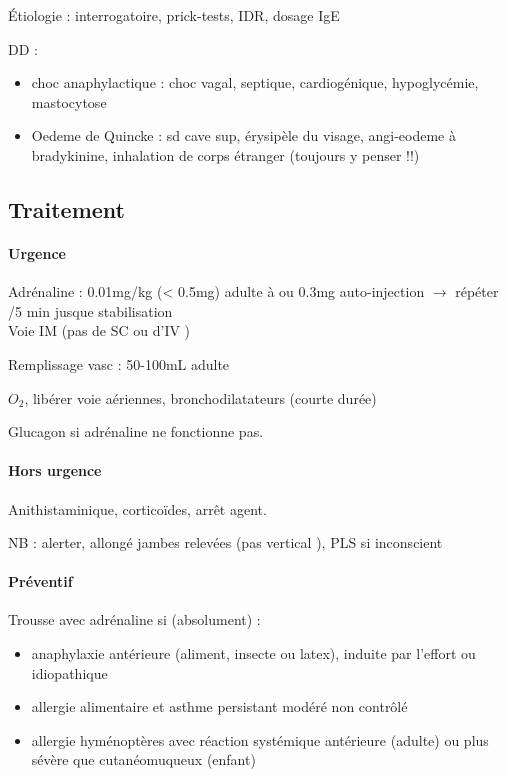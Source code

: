 \documentclass{article}
\begin{document}
Étiologie : interrogatoire, {prick-tests, IDR}, dosage IgE

DD : 
\begin{itemize}
\item choc anaphylactique : choc {vagal, septique, cardiogénique}, hypoglycémie, mastocytose
\item Oedeme de Quincke : sd cave sup, érysipèle du visage, angi-eodeme à
  bradykinine, inhalation de corps étranger (toujours y penser !!)
\end{itemize}

\subsection{Traitement}
\paragraph{Urgence}
Adrénaline : 0.01mg/kg (< 0.5mg) adulte à \faHospitalO{} ou  0.3mg
auto-injection $\rightarrow$ répéter /5 min jusque stabilisation\\
Voie IM (pas de SC ou d'IV \danger{})

Remplissage vasc : 50-100mL adulte

$O_2$, libérer voie aériennes, bronchodilatateurs (courte durée)

Glucagon si adrénaline ne fonctionne pas. 

\paragraph{Hors urgence}
Anithistaminique, corticoïdes, arrêt agent.

NB : alerter, allongé jambes relevées (pas vertical \danger{} \skull), PLS si
inconscient

\paragraph{Préventif}
Trousse avec adrénaline si (absolument) :
\begin{itemize}
\item anaphylaxie antérieure (aliment, insecte ou latex), induite par l'effort
  ou idiopathique
\item allergie alimentaire et asthme persistant modéré non contrôlé
\item allergie hyménoptères avec réaction systémique antérieure (adulte) ou
  plus sévère que cutanéomuqueux (enfant)
\end{itemize}
\end{document}
